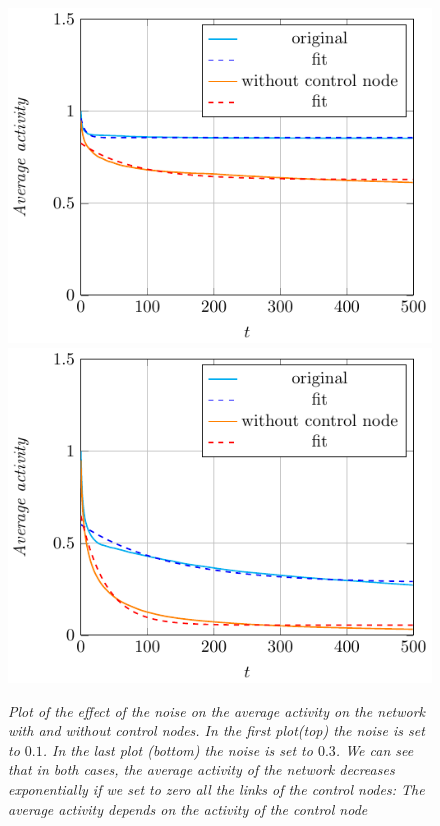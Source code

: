 \begin{figure}[H]
\centering
\includegraphics[scale=1.3]{images/noise01.pdf}
\includegraphics[scale=1.3]{images/noise03.pdf}
\caption{\emph{Plot of the effect of the noise on the average activity on the network with and without control nodes. In the first plot(top) the noise is set to $0.1$. In the last plot (bottom) the noise is set to $0.3$. We can see that in both cases, the average activity of the network decreases exponentially if we set to zero all the links of the control nodes: The average activity depends on the activity of the control node}}
\label{fig:noises}
\end{figure}

